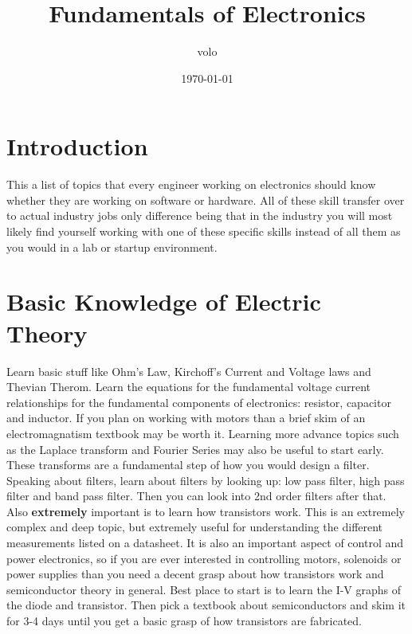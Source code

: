 \documentclass[11pt]{article}
\author{volo}
\date{\today}
\title{Fundamentals of Electronics}
\begin{document}
\maketitle
\tableofcontents

\section{Introduction}
\label{sec:orgd6d825a}
This a list of topics that every engineer working on electronics should know whether they are
working on software or hardware. All of these skill transfer over to actual industry jobs only
difference being that in the industry you will most likely find yourself working with one of these
specific skills instead of all them as you would in a lab or startup environment.
\section{Basic Knowledge of Electric Theory}
\label{sec:org901e593}
Learn basic stuff like Ohm's Law, Kirchoff's Current and Voltage laws and Thevian Therom. Learn
the equations for the fundamental voltage current relationships for the fundamental components of
electronics: resistor, capacitor and inductor. If you plan on working with motors than a brief skim
of an electromagnatism textbook may be worth it. Learning more advance topics such as the Laplace
transform and Fourier Series may also be useful to start early. These transforms are a fundamental
step of how you would design a filter. Speaking about filters, learn about filters by looking up:
low pass filter, high pass filter and band pass filter. Then you can look into 2nd order filters
after that. Also \textbf{extremely} important is to learn how transistors work. This is an extremely
complex and deep topic, but extremely useful for understanding the different measurements listed on
a datasheet. It is also an important aspect of control and power electronics, so if you are ever
interested in controlling motors, solenoids or power supplies than you need a decent grasp about
how transistors work and semiconductor theory in general. Best place to start is to learn the I-V
graphs of the diode and transistor. Then pick a textbook about semiconductors and skim it for 3-4
days until you get a basic grasp of how transistors are fabricated.
\end{document}
